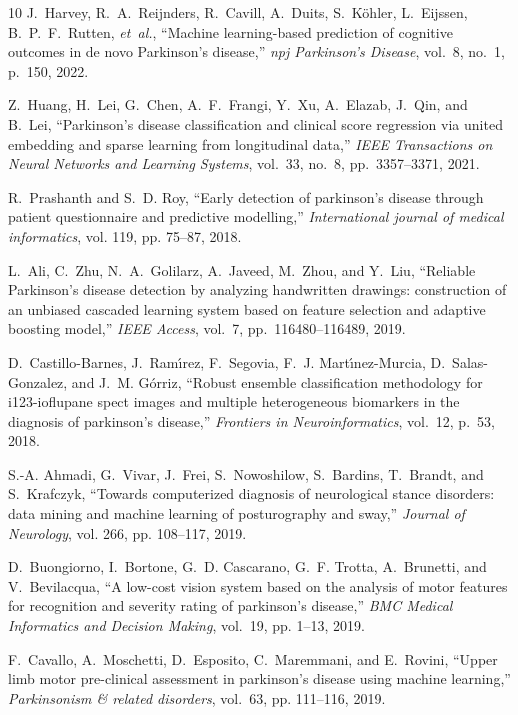 \documentclass[twocolumn]{article}
\begin{document}
\begin{thebibliography}{10}
J.~Harvey, R.~A.~Reijnders, R.~Cavill, A.~Duits, S.~K{\"o}hler, L.~Eijssen, B.~P.~F.~Rutten, \emph{et~al.},
``Machine learning-based prediction of cognitive outcomes in de novo Parkinson’s disease,''
\emph{npj Parkinson's Disease}, vol.~8, no.~1, p.~150, 2022.

Z.~Huang, H.~Lei, G.~Chen, A.~F.~Frangi, Y.~Xu, A.~Elazab, J.~Qin, and B.~Lei,
``Parkinson’s disease classification and clinical score regression via united embedding and sparse learning from longitudinal data,''
\emph{IEEE Transactions on Neural Networks and Learning Systems}, vol.~33, no.~8, pp.~3357--3371, 2021.

R.~Prashanth and S.~D. Roy, ``Early detection of parkinson’s disease through
  patient questionnaire and predictive modelling,'' \emph{International journal
  of medical informatics}, vol. 119, pp. 75--87, 2018.

L.~Ali, C.~Zhu, N.~A.~Golilarz, A.~Javeed, M.~Zhou, and Y.~Liu,
``Reliable Parkinson’s disease detection by analyzing handwritten drawings: construction of an unbiased cascaded learning system based on feature selection and adaptive boosting model,''
\emph{IEEE Access}, vol.~7, pp.~116480--116489, 2019.

D.~Castillo-Barnes, J.~Ram{\'\i}rez, F.~Segovia, F.~J. Mart{\'\i}nez-Murcia,
  D.~Salas-Gonzalez, and J.~M. G{\'o}rriz, ``Robust ensemble classification
  methodology for i123-ioflupane spect images and multiple heterogeneous
  biomarkers in the diagnosis of parkinson's disease,'' \emph{Frontiers in
  Neuroinformatics}, vol.~12, p.~53, 2018.

S.-A. Ahmadi, G.~Vivar, J.~Frei, S.~Nowoshilow, S.~Bardins, T.~Brandt, and
  S.~Krafczyk, ``Towards computerized diagnosis of neurological stance
  disorders: data mining and machine learning of posturography and sway,''
  \emph{Journal of Neurology}, vol. 266, pp. 108--117, 2019.

D.~Buongiorno, I.~Bortone, G.~D. Cascarano, G.~F. Trotta, A.~Brunetti, and
  V.~Bevilacqua, ``A low-cost vision system based on the analysis of motor
  features for recognition and severity rating of parkinson’s disease,''
  \emph{BMC Medical Informatics and Decision Making}, vol.~19, pp. 1--13, 2019.

F.~Cavallo, A.~Moschetti, D.~Esposito, C.~Maremmani, and E.~Rovini, ``Upper
  limb motor pre-clinical assessment in parkinson's disease using machine
  learning,'' \emph{Parkinsonism \& related disorders}, vol.~63, pp. 111--116,
  2019.


\end{thebibliography}
\end{document}
